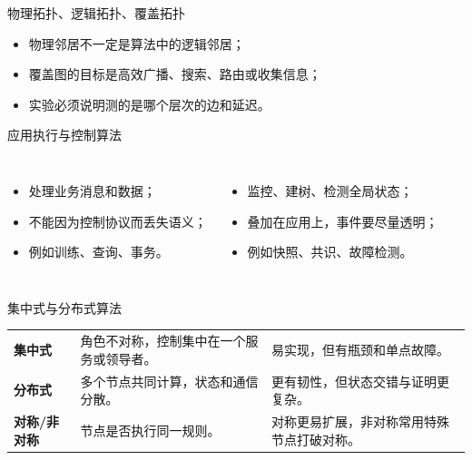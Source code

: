 \documentclass[UTF8,fontset=none,aspectratio=169,10pt]{beamer}
\begin{document}
\begin{frame}{物理拓扑、逻辑拓扑、覆盖拓扑}
\begin{center}
\end{center}
\begin{itemize}
  \item 物理邻居不一定是算法中的逻辑邻居；
  \item 覆盖图的目标是高效广播、搜索、路由或收集信息；
  \item 实验必须说明测的是哪个层次的边和延迟。
\end{itemize}
\end{frame}

\begin{frame}{应用执行与控制算法}
\begin{columns}[T,onlytextwidth]
\begin{itemize}
  \item 处理业务消息和数据；
  \item 不能因为控制协议而丢失语义；
  \item 例如训练、查询、事务。
\end{itemize}
\begin{itemize}
  \item 监控、建树、检测全局状态；
  \item 叠加在应用上，事件要尽量透明；
  \item 例如快照、共识、故障检测。
\end{itemize}
\end{columns}
\vfill
{}
\end{frame}

\begin{frame}{集中式与分布式算法}
\begin{tabularx}{\linewidth}{>{\bfseries}p{3cm}XX}
\toprule
集中式 & 角色不对称，控制集中在一个服务或领导者。 & 易实现，但有瓶颈和单点故障。 \\
分布式 & 多个节点共同计算，状态和通信分散。 & 更有韧性，但状态交错与证明更复杂。 \\
对称/非对称 & 节点是否执行同一规则。 & 对称更易扩展，非对称常用特殊节点打破对称。 \\
\bottomrule
\end{tabularx}
\end{frame}
\end{document}
